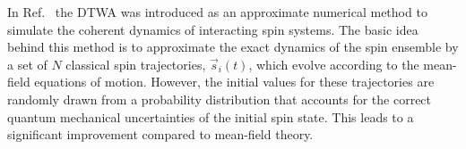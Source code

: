\documentclass[pra,twocolumn,showpacs,preprintnumbers,amsmath,amssymb,superscriptaddress]{revtex4-1}
\newcommand{\jh}[1]{\textcolor{red}{#1}}
\begin{document}
In Ref.~\cite{Schachenmayer2015} the DTWA was introduced as an approximate numerical method to simulate the coherent dynamics of interacting spin systems.
The basic idea behind this method is to approximate the exact dynamics of the spin ensemble by a set of $N$ classical spin trajectories, $\vec s_i(t)$, which evolve according to the mean-field equations of motion. However, the initial values for these trajectories are randomly drawn from a probability distribution that accounts for the correct quantum mechanical uncertainties of the initial spin state. This leads to a significant improvement compared to mean-field theory.
%
 
\end{document}
